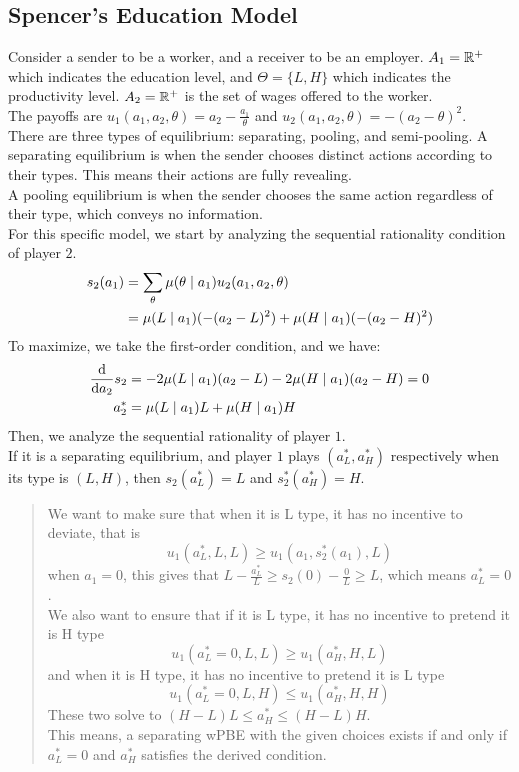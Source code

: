 \subsection{Spencer's Education Model}
Consider a sender to be a worker, and a receiver to be an employer. $A_1 = \mathbb{R}^+$ which indicates the education level, and $\Theta = \{L, H\}$ which indicates the productivity level. $A_2 = \mathbb{R}^+$ is the set of wages offered to the worker. \\
The payoffs are $u_1(a_1, a_2, \theta) = a_2 - \frac{a_1}{\theta}$ and $u_2(a_1, a_2, \theta) = -(a_2 - \theta)^2$. \\
There are three types of equilibrium: separating, pooling, and semi-pooling.
A separating equilibrium is when the sender chooses distinct actions according to their types. This means their actions are fully revealing. \\
A pooling equilibrium is when the sender chooses the same action regardless of their type, which conveys no information. \\
For this specific model, we start by analyzing the sequential rationality condition of player $2$.
\begin{align*}
    s_2(a_1) &= \sum_{\theta} \mu(\theta \mid a_1)u_2(a_1, a_2, \theta) \\
    &= \mu(L \mid a_1)(-(a_2 - L)^2) + \mu(H \mid a_1)(-(a_2 - H)^2)
\end{align*}
To maximize, we take the first-order condition, and we have:
\begin{align*}
    \dv{a_2}s_2 &= -2\mu(L \mid a_1)(a_2 - L) - 2\mu(H \mid a_1)(a_2 - H) = 0 \\
    a_2^* &= \mu(L \mid a_1)L + \mu(H \mid a_1)H
\end{align*}
Then, we analyze the sequential rationality of player $1$. \\
If it is a separating equilibrium, and player $1$ plays $(a_L^*, a_H^*)$ respectively when its type is $(L, H)$, then $s_2(a_L^*) = L$ and $s_2^*(a_H^*) = H$.
\begin{quote}
    We want to make sure that when it is L type, it has no incentive to deviate, that is
    $$u_1(a_L^*, L, L) \ge u_1(a_1, s_2^*(a_1), L)$$
    when $a_1 = 0$, this gives that $L - \frac{a_L^*}{L} \ge s_2(0) - \frac{0}{L} \ge L$, which means $a_L^* = 0$. \\
    We also want to ensure that if it is L type, it has no incentive to pretend it is H type
    $$u_1(a_L^* = 0, L, L) \ge u_1(a_H^*, H, L)$$
    and when it is H type, it has no incentive to pretend it is L type
    $$u_1(a_L^* = 0, L, H) \le u_1(a_H^*, H, H)$$
    These two solve to $(H-L)L \le a_H^* \le (H-L)H$. \\
    This means, a separating wPBE with the given choices exists if and only if $a_L^* = 0$ and $a_H^*$ satisfies the derived condition.
\end{quote}
